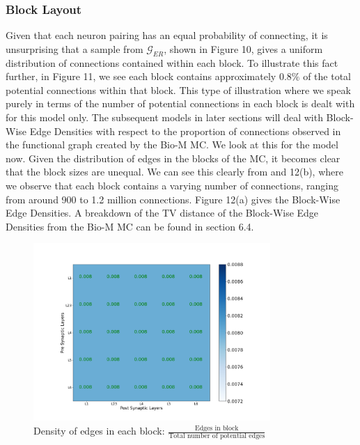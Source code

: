 \subsubsection{Block Layout}
Given that each neuron pairing has an equal probability of connecting, it is unsurprising that a sample from $\mathcal{G}_{ER}$, shown in Figure 10, gives a uniform distribution of connections contained within each block. To illustrate this fact further, in Figure 11, we see each block contains approximately $0.8\%$ of the total potential connections within that block. This type of illustration where we speak purely in terms of the number of potential connections in each block is dealt with for this model only. The subsequent models in later sections will deal with Block-Wise Edge Densities with respect to the proportion of connections observed in the functional graph created by the Bio-M MC. We look at this for the \ER model now.
Given the distribution of edges in the blocks of the MC, it becomes clear that the block sizes are unequal. We can see this clearly from and 12(b), where we observe that each block contains a varying number of connections, ranging from around 900 to 1.2 million connections. Figure 12(a) gives the Block-Wise Edge Densities. A breakdown of the TV distance of the Block-Wise Edge Densities from the Bio-M MC can be found in section 6.4.
\begin{figure}[H]
\begin{center}
\captionsetup{justification=centering}
\includegraphics[width=9cm]{ER/heat_map_layer_Erdos-Renyi probability.png}
\caption{Density of edges in each block: $\frac{\text{Edges in block}}{\text{Total number of potential edges}}$}
\end{center}
\end{figure}


